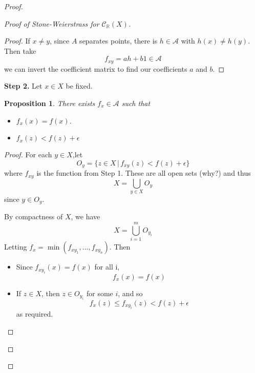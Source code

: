 \documentclass[justified]{tufte-book}
\theoremstyle{plain}%
\newtheorem{prop}[thm]{Proposition}
\theoremstyle{definition}
\theoremstyle{remark}
\newcommand{\R}{\mathbb{R}}
\begin{document}
\begin{proof}
\begin{proof}[Proof of Stone-Weierstrass for $\mathcal{C}_\R(X)$]
\begin{proof}
          If $x \neq y$, since $A$ separates points, there is $h \in \mathcal{A}$ with $h(x) \neq h(y)$.  Then take \[
              f_{xy} = a h + b 1 \in \mathcal{A}
          \] we can invert the coefficient matrix to find our coefficients $a$ and $b$.  
      \end{proof}
      
      \textbf{Step 2.} Let $x \in X$ be fixed.  
      \begin{prop}
          There exists $f_x \in \mathcal{A}$ such that \begin{itemize}
              \item $f_x(x) = f(x)$.  
              \item $f_x(z) < f(z) + \epsilon$
          \end{itemize}
      \end{prop}
      \begin{proof}
          For each $y \in X$,let \[
              O_y = \{ z \in X \, | \, f_{xy}(z) < f(z) + \epsilon \}
          \] where $f_{xy}$ is the function from Step 1.  These are all open sets (why?) and thus \[
              X = \bigcup_{y \in X} O_y
          \] since $y \in O_y$.  
          
          By compactness of $X$, we have \[
              X = \bigcup_{i=1}^m O_{y_i}
          \]  Letting $f_x = \min(f_{xy_1}, \dots, f_{xy_n})$.  Then 
          \begin{itemize}
              \item Since $f_{xy_i}(x) = f(x)$ for all i, \[
                  f_x(x) = f(x)
              \]
              \item If $z \in X$, then $z \in O_{y_i}$ for some $i$, and so \[
                  f_x(z) \leq f_{x y_i}(z) < f(z) + \epsilon
              \] as required. \qedhere
          \end{itemize} 
      \end{proof}
      

\end{proof}
\end{proof}
\end{document}
